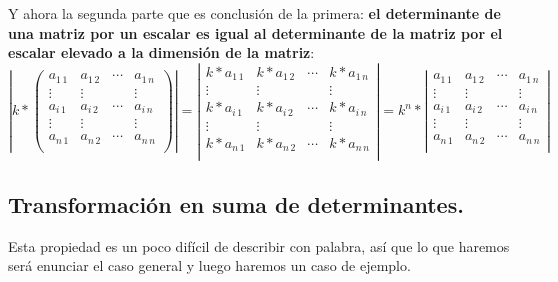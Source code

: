 \documentclass[a4paper,11pt,answers]{exam}
\begin{document}
Y ahora la segunda parte que es conclusión de la primera: \textbf{el determinante de una matriz por un escalar es igual al determinante de la matriz por el escalar elevado a la dimensión de la matriz}:
\[\left|k*\left(\begin{array}{cccc}
a_{1\,1}&a_{1\,2}&\cdots&a_{1\,n}\\
\vdots&\vdots&&\vdots\\
a_{i\,1}&a_{i\,2}&\cdots&a_{i\,n}\\
\vdots&\vdots&&\vdots\\
a_{n\,1}&a_{n\,2}&\cdots&a_{n\,n}\\
\end{array}\right)\right| = \left|\begin{array}{cccc}
k*a_{1\,1}&k*a_{1\,2}&\cdots&k*a_{1\,n}\\
\vdots&\vdots&&\vdots\\
k*a_{i\,1}&k*a_{i\,2}&\cdots&k*a_{i\,n}\\
\vdots&\vdots&&\vdots\\
k*a_{n\,1}&k*a_{n\,2}&\cdots&k*a_{n\,n}\\
\end{array}\right|= k^n*\left|\begin{array}{cccc}
a_{1\,1}&a_{1\,2}&\cdots&a_{1\,n}\\
\vdots&\vdots&&\vdots\\
a_{i\,1}&a_{i\,2}&\cdots&a_{i\,n}\\
\vdots&\vdots&&\vdots\\
a_{n\,1}&a_{n\,2}&\cdots&a_{n\,n}\\
\end{array}\right|\]

\subsection{Transformación en suma de determinantes.}
Esta propiedad es un poco difícil de describir con palabra, así que lo que haremos será enunciar el caso general y luego haremos un caso de ejemplo.\\
\end{document}

